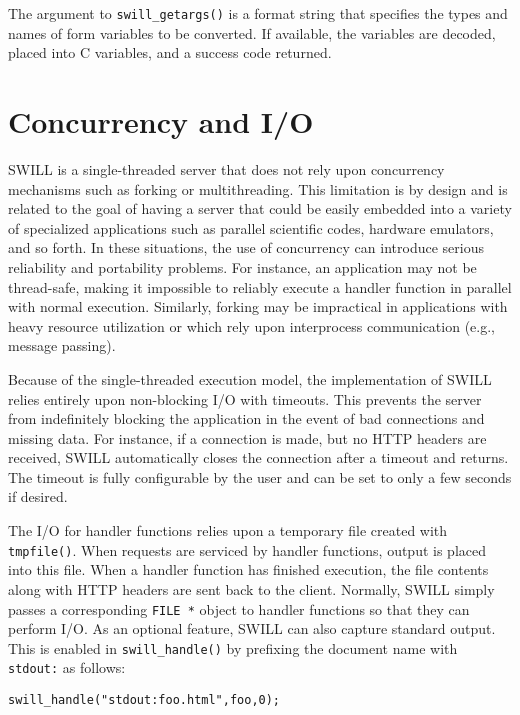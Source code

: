 \noindent
The argument to {\tt swill\_getargs()} is a format string that
specifies the types and names of form variables to be converted.  If
available, the variables are decoded, placed into C variables, and a
success code returned.

\section{Concurrency and I/O}

SWILL is a single-threaded server that does not rely upon concurrency
mechanisms such as forking or multithreading.  This limitation is by
design and is related to the goal of having a server that could be
easily embedded into a variety of specialized applications such as
parallel scientific codes, hardware emulators, and so forth.  In these
situations, the use of concurrency can introduce serious
reliability and portability problems.  For instance, an application
may not be thread-safe, making it impossible to reliably execute a
handler function in parallel with normal execution.  Similarly,
forking may be impractical in applications with heavy resource
utilization or which rely upon interprocess communication (e.g.,
message passing).

Because of the single-threaded execution model, the implementation of
SWILL relies entirely upon non-blocking I/O with timeouts.  This
prevents the server from indefinitely blocking the application in the
event of bad connections and missing data. For instance,
if a connection is made, but no HTTP headers are received, SWILL
automatically closes the connection after a timeout and returns.  
The timeout is
fully configurable by the user and can be set to only a few seconds if
desired.

The I/O for handler functions relies upon a temporary file created
with {\tt tmpfile()}.  When requests are serviced by handler
functions, output is placed into this file.  When a handler function
has finished execution, the file contents along with HTTP headers are
sent back to the client.  Normally, SWILL simply passes a corresponding
{\tt FILE *} object to handler functions so that they can perform I/O.
As an optional feature, SWILL can also capture standard output.
This is enabled in {\tt swill\_handle()} by prefixing the document name
with {\tt stdout:} as follows:

\begin{verbatim}
swill_handle("stdout:foo.html",foo,0);
\end{verbatim}

